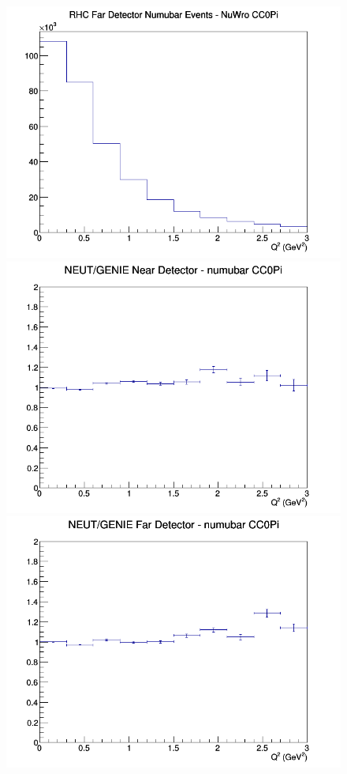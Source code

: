 \documentclass[12pt]{article}
\begin{document}
\begin{figure}[h]
\endminipage
{}
\includegraphics[width=\linewidth]{Q2/nominal/CC0Pi_RHC_FD_numubar_Q2_NuWro.png}
\endminipage
\newline
{}
\includegraphics[width=\linewidth]{Q2/nominal/ratios/CC0Pi_NEUT_GENIE_numubar_near_Q2.png}
\endminipage
{}
\includegraphics[width=\linewidth]{Q2/nominal/ratios/CC0Pi_NEUT_GENIE_numubar_far_Q2.png}

\end{figure}
\end{document}
